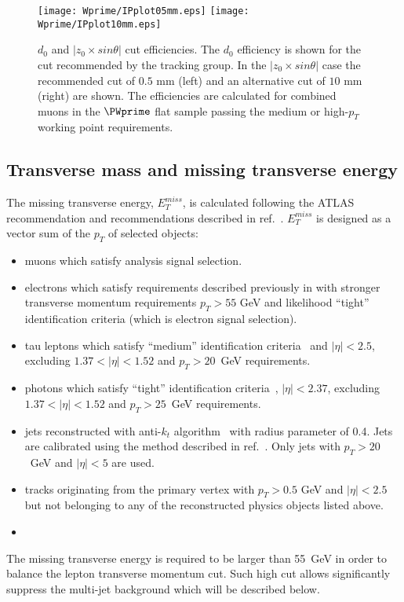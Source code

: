\begin{figure}[]
  \centering
  \texttt{[image: Wprime/IPplot05mm.eps]}
  \texttt{[image: Wprime/IPplot10mm.eps]}
  \caption{$d_{0}$ and $|z_0 \times sin \theta|$ cut efficiencies. The $d_{0}$ efficiency is shown for the cut recommended by the tracking group. In the $|z_0 \times sin \theta|$ case the recommended cut of $0.5$ mm (left) and an alternative cut of $10$ mm (right) are shown. The efficiencies are calculated for combined muons in the
$\PWprime$ flat sample passing the medium or high-$p_T$ working point requirements.}
  \label{fig:Muon_LepVtxEff}
\end{figure}


\subsection{Transverse mass and missing transverse energy}
\label{subsec:etmiss}
The missing transverse energy, $E_T^{miss}$, is calculated following the ATLAS recommendation and recommendations described in ref.~\cite{met2015_1,met2015_2}.
$E_T^{miss}$ is designed as a vector sum of the $p_T$ of selected objects:
\begin{itemize}
 \item muons which satisfy analysis signal selection.
 \item electrons which satisfy requirements described previously in
  with stronger transverse momentum requirements $p_T > 55$ GeV
 and likelihood ``tight'' identification criteria (which is electron signal selection).
 \item tau leptons which satisfy ``medium'' identification criteria~\cite{tau_id_8TeV} and $|\eta| < 2.5$, excluding  $1.37 < |\eta| < 1.52$ and $p_T > 20$~GeV requirements.
 \item photons which satisfy ``tight'' identification criteria~\cite{photon_id_2011}, $|\eta| < 2.37$, excluding  $1.37 < |\eta| < 1.52$ and $p_T > 25$~GeV requirements.
 \item jets reconstructed with anti-$k_t$ algorithm~\cite{jet_anti_kt} with radius parameter of 0.4.
 Jets are calibrated using the method described in ref.~\cite{jet_calib_syst_13TeV}.
 Only jets with $p_T > 20$~GeV and $|\eta| < 5$ are used.
 \item tracks originating from the primary vertex with $p_T > 0.5$ GeV and $|\eta| < 2.5$ but not belonging to any of the reconstructed physics objects listed above.
 \item {}
\end{itemize}
The missing transverse energy is required to be larger than 55~GeV in order 
to balance the lepton transverse momentum cut.
Such high cut allows significantly suppress 
the multi-jet background which will be described below.

